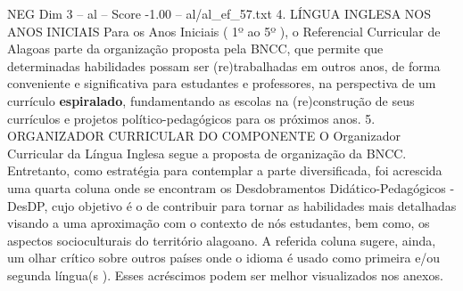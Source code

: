 \begin{textsample}{NEG Dim 3 – al – Score -1.00 – al/al\_ef\_57.txt}  \label{ex:f3_neg_072}
4.
LÍNGUA INGLESA NOS ANOS INICIAIS Para os Anos Iniciais ( 1º ao 5º ), o Referencial Curricular de Alagoas parte da organização proposta pela BNCC, que permite que determinadas habilidades possam ser (re)trabalhadas em outros anos, de forma conveniente e significativa para estudantes e professores, na perspectiva de um currículo \textbf{espiralado}, fundamentando as escolas na (re)construção de seus currículos e projetos político-pedagógicos para os próximos anos. 5.
ORGANIZADOR CURRICULAR DO COMPONENTE O Organizador Curricular da Língua Inglesa segue a proposta de organização da BNCC.
Entretanto, como estratégia para contemplar a parte diversificada, foi acrescida uma quarta coluna onde se encontram os Desdobramentos Didático-Pedagógicos - DesDP, cujo objetivo é o de contribuir para tornar as habilidades mais detalhadas visando a uma aproximação com o contexto de nós estudantes, bem como, os aspectos socioculturais do território alagoano.
A referida coluna sugere, ainda, um olhar crítico sobre outros países onde o idioma é usado como primeira e/ou segunda língua(s ).
Esses acréscimos podem ser melhor visualizados nos anexos.

\end{textsample}
